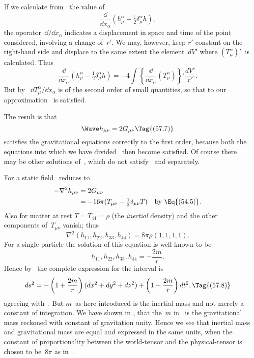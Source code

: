 \documentclass[12pt]{book}
\begin{document}
If we calculate from~ the value of
\[
\frac{\dd}{\dd x_{\alpha}} (h_{\mu}^{\alpha} - \tfrac{1}{2} \delta_{\mu}^{\alpha} h),
\]
the operator~$\dd/\dd x_{\alpha}$ indicates a displacement in space and time of the point
considered, involving a change of~$r'$. We may, however, keep $r'$ constant on the
right-hand side and displace to the same extent the element~$dV'$ where $(T_{\mu}^{\alpha})'$~is
calculated. Thus
\[
\frac{\dd}{\dd x_{\alpha}} (h_{\mu}^{\alpha} - \tfrac{1}{2} \delta_{\mu}^{\alpha} h)
= -4\int \left\{\frac{\dd}{\dd x_{\alpha}}(T_{\mu}^{\alpha})\right\}' \frac{dV'}{r'}.
\]
But by~ $\dd T_{\mu}^{\alpha}/\dd x_{\alpha}$ is of the second order of small quantities, so that to our
approximation ~is satisfied.

The result is that
\[
\Wave h_{\mu\nu} = 2G_{\mu\nu}
\Tag{(57.7)}
\]
satisfies the gravitational equations correctly to the first order, because both
the equations into which we have divided~ then become satisfied. Of
course there may be other solutions of~, which do not satisfy ~and
 separately.

For a static field ~reduces to
\begin{align*}
  -\nabla^{2} h_{\mu\nu}
  &= 2G_{\mu\nu} \\
  &= -16\pi (T_{\mu\nu} - \tfrac{1}{2} \delta_{\mu\nu}T)
  \quad\text{by~\Eq{(54.5)}.}
\end{align*}
Also for matter at rest $T = T_{44} = \rho$ (the \emph{inertial} density) and the other components
of~$T_{\mu\nu}$ vanish; thus
\[
\nabla^{2} (h_{11}, h_{22}, h_{33}, h_{44}) = 8\pi\rho(1, 1, 1, 1).
\]
For a single particle the solution of this equation is well known to be
\[
h_{11}, h_{22}, h_{33}, h_{44} = -\frac{2m}{r}.
\]
Hence by~ the complete expression for the interval is
\[
ds^{2} = -\left(1 + \frac{2m}{r}\right)(dx^{2} + dy^{2} + dz^{2})
  + \left(1 - \frac{2m}{r}\right) dt^{2},
\Tag{(57.8)}
\]
agreeing with~. But $m$~as here introduced is the inertial mass and not
%
%
%
merely a constant of integration. We have shown in ,  that the~$m$ in~
is the gravitational mass reckoned with constant of gravitation unity.
Hence we see that inertial mass and gravitational mass are equal and expressed
in the same units, when the constant of proportionality between the
world-tensor and the physical-tensor is chosen to be~$8\pi$ as in~.
\end{document}
